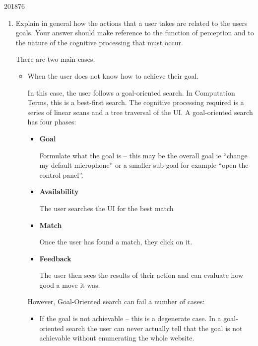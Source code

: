 \documentclass[10pt,\jkfside,a4paper]{article}
\begin{document}
\begin{examquestion}{2018}{7}{6}

\begin{enumerate}

\item Explain in general how the actions that a user takes are related to
the users goals. Your answer should make reference to the function of
perception and to the nature of the cognitive processing that must occur.

There are two main cases.

\begin{itemize}

\item When the user does not know how to achieve their goal.

In this case, the user follows a goal-oriented search. In Computation
Terms, this is a best-first search. The cognitive
processing required is a series of linear scans and a tree traversal of
the UI. A goal-oriented search has four phases:

\begin{itemize}

\item \textbf{Goal}

Formulate what the goal is -- this may be the overall goal ie ``change my
default microphone'' or a smaller sub-goal for example ``open the control
panel''.

\item \textbf{Availability}

The user searches the UI for the best match

\item \textbf{Match}

Once the user has found a match, they click on it.

\item \textbf{Feedback}

The user then sees the results of their action and can evaluate how good a
move it was.

\end{itemize}

However, Goal-Oriented search can fail a number of cases:

\begin{itemize}

\item If the goal is not achievable -- this is a degenerate case. In a
goal-oriented search the user can never actually tell that the goal is not
achievable without enumerating the whole website.


\end{itemize}
\end{itemize}
\end{enumerate}
\end{examquestion}
\end{document}
